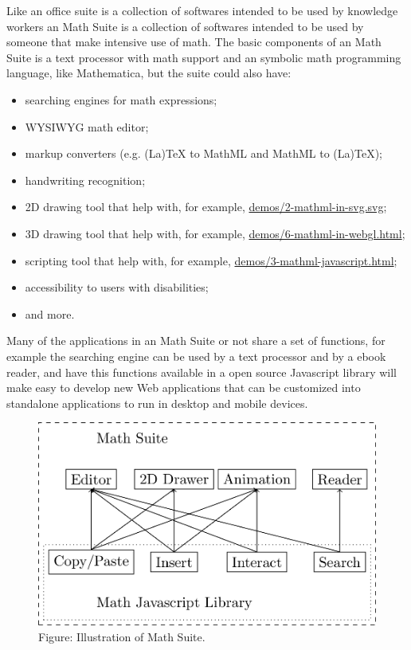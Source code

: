 Like an office suite is a collection of softwares intended to be used by
knowledge workers an Math Suite is a collection of softwares intended to be used
by someone that make intensive use of math. The basic components of an Math
Suite is a text processor with math support and an symbolic math programming
language, like Mathematica, but the suite could also have:
\begin{itemize}
  \item searching engines for math expressions;
  \item WYSIWYG math editor;
  \item markup converters (e.g. (La)TeX to MathML and MathML to (La)TeX);
  \item handwriting recognition;
  \item 2D drawing tool that help with, for example,
    \href{http://fred-wang.github.io/MathUI2014/demos/2-mathml-in-svg.svg}{demos/2-mathml-in-svg.svg};
  \item 3D drawing tool that help with, for example,
    \href{http://fred-wang.github.io/MathUI2014/demos/6-mathml-in-webgl.html}{demos/6-mathml-in-webgl.html};
  \item scripting tool that help with, for example,
    \href{http://fred-wang.github.io/MathUI2014/demos/3-mathml-javascript.html}{demos/3-mathml-javascript.html};
  \item accessibility to users with disabilities;
  \item and more.
\end{itemize}

Many of the applications in an Math Suite or not share a set of functions, for
example the searching engine can be used by a text processor and by a ebook
reader, and have
this functions available in a open source Javascript library will make easy to
develop new Web applications that can be customized into standalone applications
to run in desktop and mobile devices.

\begin{figure}[!htb]
  \centering
  \includegraphics[width=.5\textwidth]{math-suite-diagram.png} \\
  Figure: Illustration of Math Suite.
\end{figure}

